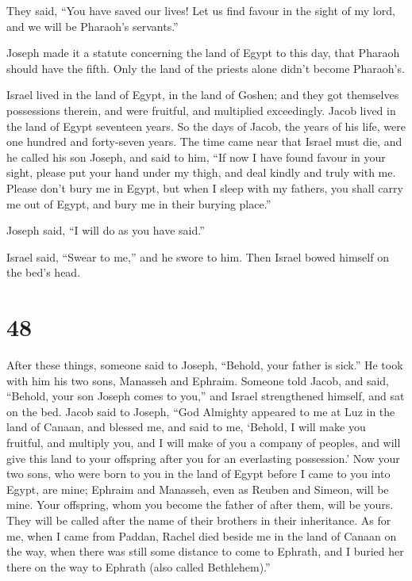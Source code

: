  They said, ``You have saved our lives! Let us find favour
in the sight of my lord, and we will be Pharaoh's servants.''

 Joseph made it a statute concerning the land of Egypt to
this day, that Pharaoh should have the fifth. Only the land of the
priests alone didn't become Pharaoh's.

 Israel lived in the land of Egypt, in the land of Goshen;
and they got themselves possessions therein, and were fruitful, and
multiplied exceedingly.  Jacob lived in the land of Egypt
seventeen years. So the days of Jacob, the years of his life, were one
hundred and forty-seven years.  The time came near that
Israel must die, and he called his son Joseph, and said to him, ``If now
I have found favour in your sight, please put your hand under my thigh,
and deal kindly and truly with me. Please don't bury me in Egypt,
 but when I sleep with my fathers, you shall carry me out
of Egypt, and bury me in their burying place.''

Joseph said, ``I will do as you have said.''

 Israel said, ``Swear to me,'' and he swore to him. Then
Israel bowed himself on the bed's head.

\hypertarget{section-47}{%
\section{48}\label{section-47}}

 After these things, someone said to Joseph, ``Behold, your
father is sick.'' He took with him his two sons, Manasseh and Ephraim.
 Someone told Jacob, and said, ``Behold, your son Joseph
comes to you,'' and Israel strengthened himself, and sat on the bed.
 Jacob said to Joseph, ``God Almighty appeared to me at Luz
in the land of Canaan, and blessed me,  and said to me,
`Behold, I will make you fruitful, and multiply you, and I will make of
you a company of peoples, and will give this land to your offspring
after you for an everlasting possession.'  Now your two
sons, who were born to you in the land of Egypt before I came to you
into Egypt, are mine; Ephraim and Manasseh, even as Reuben and Simeon,
will be mine.  Your offspring, whom you become the father of
after them, will be yours. They will be called after the name of their
brothers in their inheritance.  As for me, when I came from
Paddan, Rachel died beside me in the land of Canaan on the way, when
there was still some distance to come to Ephrath, and I buried her there
on the way to Ephrath (also called Bethlehem).''

